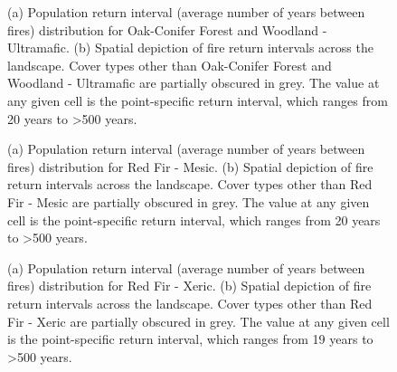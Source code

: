 \begin{figure}[!htbp]
  \centering
  \caption{(a) Population return interval (average number of years between fires) distribution for Oak-Conifer Forest and Woodland - Ultramafic.  (b) Spatial depiction of fire return intervals across the landscape. Cover types other than Oak-Conifer Forest and Woodland - Ultramafic are partially obscured in grey. The value at any given cell is the point-specific return interval, which ranges from 20 years to \textgreater 500 years.}
\label{fig:preturn_ocfwu}
\end{figure}

\begin{figure}[!htbp]
  \centering
  \caption{(a) Population return interval (average number of years between fires) distribution for Red Fir - Mesic.  (b) Spatial depiction of fire return intervals across the landscape. Cover types other than Red Fir - Mesic are partially obscured in grey. The value at any given cell is the point-specific return interval, which ranges from 20 years to \textgreater 500 years.}
\label{fig:preturn_rfrm}
\end{figure}

\begin{figure}[!htbp]
  \centering
  \caption{(a) Population return interval (average number of years between fires) distribution for Red Fir - Xeric.  (b) Spatial depiction of fire return intervals across the landscape. Cover types other than Red Fir - Xeric are partially obscured in grey. The value at any given cell is the point-specific return interval, which ranges from 19 years to \textgreater 500 years.}
\label{fig:preturn_rfrx}
\end{figure}

